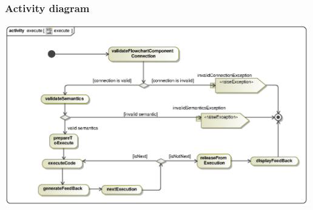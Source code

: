 \documentclass[11pt,a4paper,titlepage]{article}
\begin{document}
\subsubsection{Activity diagram}
\includegraphics[width=500px]{executeAct.eps}
\end{document}
